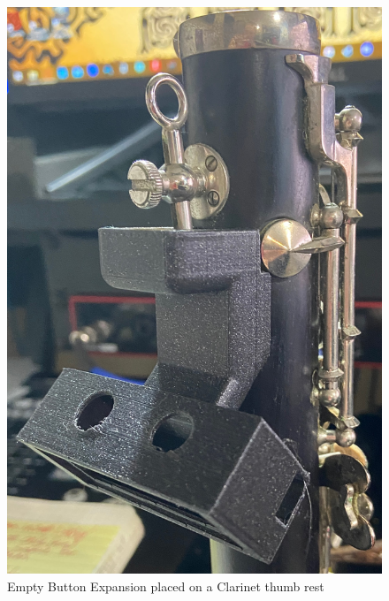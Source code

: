 \begin{center}
    \begin{figure}
        \centering
        \includegraphics[scale=0.08]{diagrams/builtUnits/thumbOnInst.JPG}
        \caption{Empty Button Expansion placed on a Clarinet thumb rest}
        \label{fig:thumbOnCase}
    \end{figure}
\end{center}

